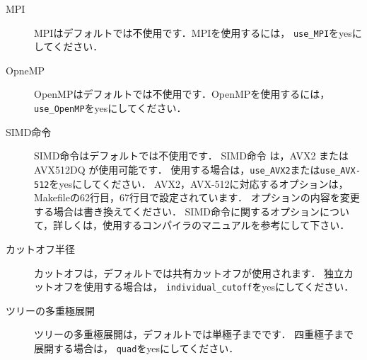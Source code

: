 \documentclass[12pt,a4paper,dvipdfmx]{jsarticle}
\begin{document}
\begin{description}
\item[MPI]
MPIはデフォルトでは不使用です．MPIを使用するには，
\texttt{use\_MPI}をyesにしてください．

\item[OpneMP]
OpenMPはデフォルトでは不使用です．OpenMPを使用するには，
\texttt{use\_OpenMP}をyesにしてください．

\item[SIMD命令]
SIMD命令はデフォルトでは不使用です．
SIMD命令 は，AVX2 または AVX512DQ が使用可能です．
使用する場合は，\texttt{use\_AVX2}または\texttt{use\_AVX-512}をyesにしてください．
AVX2，AVX-512に対応するオプションは，Makefileの62行目，67行目で設定されています．
オプションの内容を変更する場合は書き換えてください．
SIMD命令に関するオプションについて，詳しくは，使用するコンパイラのマニュアルを参考にして下さい．

\item[カットオフ半径]
カットオフは，デフォルトでは共有カットオフが使用されます．
独立カットオフを使用する場合は，%
\texttt{individual\_cutoff}をyesにしてください．


\item[ツリーの多重極展開]
ツリーの多重極展開は，デフォルトでは単極子までです．
四重極子まで展開する場合は， %
\texttt{quad}をyesにしてください．





\end{description}
\end{document}

